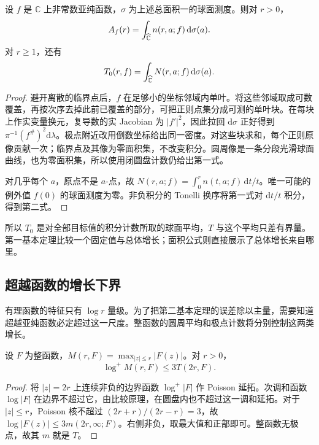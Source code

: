 \begin{proposition}[球面上的平均计数]\label{b3:prop:C-spherical-counting}
设 \(f\) 是 \(\mathbb C\) 上非常数亚纯函数，\(\sigma\) 为上述总面积一的球面测度。则对 \(r>0\)，
\[
 A_f(r)=\int_{\widehat{\mathbb C\kern0pt}}n(r,a;f)\,\mathrm{d}\sigma(a).
\]
对 \(r\ge1\)，还有
\[
 T_0(r,f)=\int_{\widehat{\mathbb C\kern0pt}}N(r,a;f)\,\mathrm{d}\sigma(a).
\]
\end{proposition}
\begin{proof}
避开离散的临界点后，\(f\) 在足够小的坐标邻域内单叶。将这些邻域取成可数覆盖，再按次序去掉此前已覆盖的部分，可把正则点集分成可测的单叶块。在每块上作实变量换元，复导数的实 Jacobian 为 \(|f'|^2\)，因此拉回 \(\mathrm{d}\sigma\) 正好得到 \(\pi^{-1}(f^\#)^2\mathrm{d}\lambda\)。极点附近改用倒数坐标给出同一密度。对这些块求和，每个正则原像贡献一次；临界点及其像为零面积集，不改变积分。圆周像是一条分段光滑球面曲线，也为零面积集，所以使用闭圆盘计数仍给出第一式。

对几乎每个 \(a\)，原点不是 \(a\)-点，故 \(N(r,a;f)=\int_0^r n(t,a;f)\,\mathrm{d}t/t\)。唯一可能的例外值 \(f(0)\) 的球面测度为零。非负积分的 Tonelli 换序将第一式对 \(\mathrm{d}t/t\) 积分，得到第二式。
\end{proof}

所以 \(T_0\) 是对全部目标值的积分计数所取的球面平均，\(T\) 与这个平均只差有界量。第一基本定理比较一个固定值与总体增长；面积公式则直接展示了总体增长来自哪里。

\subsection{超越函数的增长下界}
\label{b3:subsec:C0204}

有理函数的特征只有 \(\log r\) 量级。为了把第二基本定理的误差除以主量，需要知道超越亚纯函数必定超过这一尺度。整函数的圆周平均和极点计数将分别控制这两类增长。

\begin{lemma}[整函数的内部最大值控制]\label{b3:lem:C-entire-mean}
设 \(F\) 为整函数，\(M(r,F)=\max_{|z|\le r}|F(z)|\)。对 \(r>0\)，
\[
 \log^+M(r,F)\le3T(2r,F).
\]
\end{lemma}
\begin{proof}
将 \(|z|=2r\) 上连续非负的边界函数 \(\log^+|F|\) 作 Poisson 延拓。次调和函数 \(\log|F|\) 在边界不超过它，由比较原理，在圆盘内也不超过这一调和延拓。对于 \(|z|\le r\)，Poisson 核不超过 \((2r+r)/(2r-r)=3\)，故 \(\log|F(z)|\le3m(2r,\infty;F)\)。右侧非负，取最大值和正部即可。整函数无极点，故其 \(m\) 就是 \(T\)。
\end{proof}

